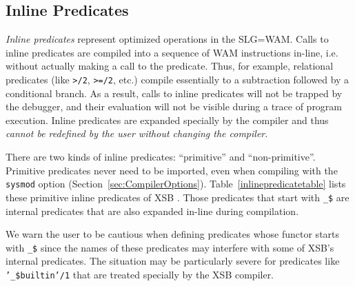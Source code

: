\subsection{Inline Predicates}\label{inline_predicates}

{\em Inline predicates} represent optimized operations in the SLG=WAM.
Calls to inline predicates are compiled into a sequence of WAM
instructions in-line, i.e. without actually making a call to the
predicate.  Thus, for example, relational predicates (like {\tt >/2},
{\tt >=/2}, etc.)  compile essentially to a subtraction followed by a
conditional branch.  As a result, calls to inline predicates will not
be trapped by the debugger, and their evaluation will not be visible
during a trace of program execution.  Inline predicates are expanded
specially by the compiler and thus {\em cannot be redefined by the
  user without changing the compiler}.

There are two kinds of inline predicates: ``primitive'' and
``non-primitive''.  Primitive predicates never need to be imported,
even when compiling with the {\tt sysmod} option
(Section~\ref{sec:CompilerOptions}).  Table~\ref{inlinepredicatetable}
lists these primitive inline predicates of XSB \version.  Those
predicates that start with \verb|_$| are internal predicates that are
also expanded in-line during compilation.

\begin{table}[htbp]
\caption{The Inline Predicates of XSB}\label{inlinepredicatetable}
\end{table}

We warn the user to be cautious when defining predicates whose functor
starts with {\tt \_\$} since the names of these predicates may
interfere with some of XSB's internal predicates.  The situation may
be particularly severe for predicates like {\tt '\_\$builtin'/1} that
are treated specially by the XSB compiler.

